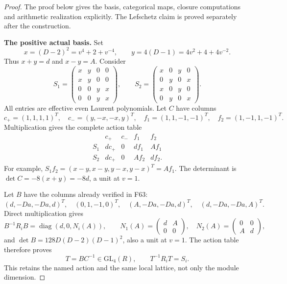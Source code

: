 \documentclass[11pt,a4paper]{article}
\newcommand{\A}{\mathbb A}\newcommand{\PP}{\mathbb P}\newcommand{\GL}{\mathrm{GL}}
\newcommand{\fid}[1]{\textsf{#1}}\newcommand{\gate}[1]{\textsf{#1}}
\theoremstyle{named}\newtheorem{finding}{Finding}[section]
\theoremstyle{definition}\newtheorem{definition}[finding]{Definition}
\theoremstyle{remark}\newtheorem{remark}[finding]{Remark}
\begin{document}
\begin{proof}
The proof below gives the basis, categorical maps,
closure computations and arithmetic realization
explicitly. The Lefschetz claim is proved separately
after the construction.

\par\smallskip\noindent\textbf{The positive actual basis.}\quad
Set
\begin{equation}\label{eq:positiveIteratedXY}
 x=(D-2)^2=v^4+2+v^{-4},\qquad
 y=4(D-1)=4v^2+4+4v^{-2}.
\end{equation}
Thus \(x+y=d\) and \(x-y=A\).
Consider
\begin{equation}\label{eq:positiveIteratedMatrices}
 S_1=\begin{pmatrix}
 x&y&0&0\\x&y&0&0\\0&0&y&x\\0&0&y&x
 \end{pmatrix},\qquad
 S_2=\begin{pmatrix}
 x&0&y&0\\0&y&0&x\\x&0&y&0\\0&y&0&x
 \end{pmatrix}.
\end{equation}
All entries are effective even Laurent polynomials.
Let \(C\) have columns
\[
 c_+=(1,1,1,1)^T,\quad c_-=(y,-x,-x,y)^T,
 \quad f_1=(1,1,-1,-1)^T,\quad f_2=(1,-1,1,-1)^T.
\]
Multiplication gives the complete action table
\[
\begin{array}{c|cccc}
 &c_+&c_-&f_1&f_2\\\hline
 S_1&dc_+&0&df_1&Af_1\\
 S_2&dc_+&0&Af_2&df_2.
\end{array}
\]
For example,
\(S_1f_2=(x-y,x-y,y-x,y-x)^T=Af_1\).
The determinant is \(\det C=-8(x+y)=-8d\), a unit
at \(v=1\).

Let \(B\) have the columns already verified in
\fid{F63}:
\[
 (d,-Da,-Da,d)^T,\quad(0,1,-1,0)^T,\quad
 (A,-Da,-Da,d)^T,\quad(d,-Da,-Da,A)^T.
\]
Direct multiplication gives
\[
 B^{-1}R_iB=\operatorname{diag}(d,0,N_i(A)),\qquad
 N_1(A)=\begin{pmatrix}d&A\\0&0\end{pmatrix},\quad
 N_2(A)=\begin{pmatrix}0&0\\A&d\end{pmatrix},
\]
and \(\det B=128D(D-2)(D-1)^2\), also a unit
at \(v=1\).
The action table therefore proves
\begin{equation}\label{eq:positiveIteratedIntertwiner}
 T=BC^{-1}\in\GL_4(R),\qquad T^{-1}R_iT=S_i.
\end{equation}
This retains the named action and the same local
lattice, not only the module dimension.


\end{proof}
\end{document}
